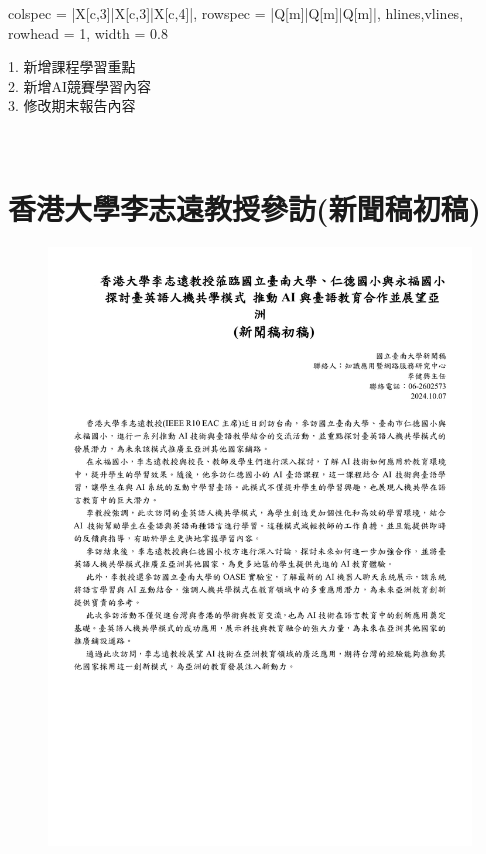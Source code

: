 \begin{longtblr}[
    caption = {版本異動紀錄},
    label = {table:version},
]{
    colspec = {|X[c,3]|X[c,3]|X[c,4]|},
    rowspec = {|Q[m]|Q[m]|Q[m]|},
    hlines,vlines,
    rowhead = 1,
    width = 0.8\linewidth
}
\begin{minipage}[c]{0.3\textwidth}
                        \vspace{10pt}
                        \centering %
                        \raggedright %
                        1. 新增課程學習重點\\ 
                        2. 新增AI競賽學習內容\\
                        3. 修改期末報告內容\\
                        \vspace{10pt}
                    \end{minipage} \\
\end{longtblr}





\chapter{香港大學李志遠教授參訪(新聞稿初稿)} \label{appendix:HKUni}
\begin{figure}[htbp!]
    \centering
    \includegraphics[scale=0.62]{images/w5/香港大學李志遠教授參訪(新聞稿初稿)-10072024-1.pdf}
\end{figure}


